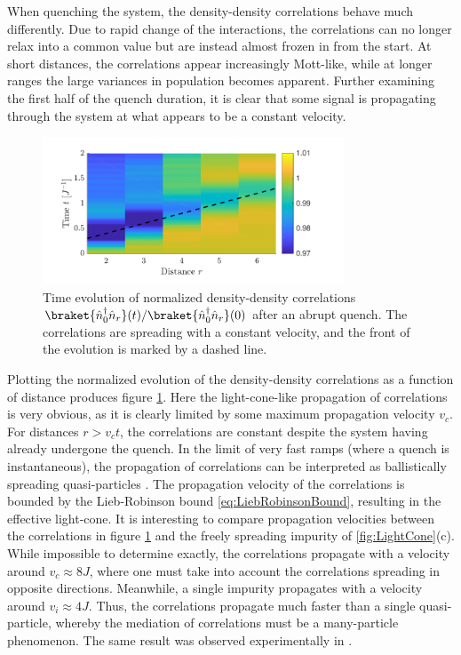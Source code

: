When quenching the system, the density-density correlations behave much differently. Due to rapid change of the interactions, the correlations can no longer relax into a common value but are instead almost frozen in from the start. At short distances, the correlations appear increasingly Mott-like, while at longer ranges the large variances in population becomes apparent. Further examining the first half of the quench duration, it is clear that some signal is propagating through the system at what appears to be a constant velocity.
\begin{figure}[h!]
    \centering
    \includegraphics[width=0.8\textwidth]{Figures/L20/CorrelationLightCone.pdf}
    \caption{Time evolution of normalized density-density correlations $\braket{\hat{n}_{0}^{\dag} \hat{n}_{r}}(t) / \braket{\hat{n}_{0}^{\dag} \hat{n}_{r}}(0)$ after an abrupt quench. The correlations are spreading with a constant velocity, and the front of the evolution is marked by a dashed line.}
    \label{fig:CorrelationLightCone}
\end{figure}
Plotting the normalized evolution of the density-density correlations as a function of distance produces figure \ref{fig:CorrelationLightCone}. Here the light-cone-like propagation of correlations is very obvious, as it is clearly limited by some maximum propagation velocity $v_c$. For distances $r >  v_c t$, the correlations are constant despite the system having already undergone the quench. In the limit of very fast ramps (where a quench is instantaneous), the propagation of correlations can be interpreted as ballistically spreading quasi-particles \cite{Cheneau2012,Calabrese2006}. The propagation velocity of the correlations is bounded by the Lieb-Robinson bound \eqref{eq:LiebRobinsonBound}, resulting in the effective light-cone. 
It is interesting to compare propagation velocities between the correlations in figure \ref{fig:CorrelationLightCone} and the freely spreading impurity of \ref{fig:LightCone}(c). While impossible to determine exactly, the correlations propagate with a velocity around $v_c \approx 8 J$, where one must take into account the correlations spreading in opposite directions. Meanwhile, a single impurity propagates with a velocity around $v_i \approx 4 J$. Thus, the correlations propagate much faster than a single quasi-particle, whereby the mediation of correlations must be a many-particle phenomenon. The same result was observed experimentally in \cite{Cheneau2012}.\\

